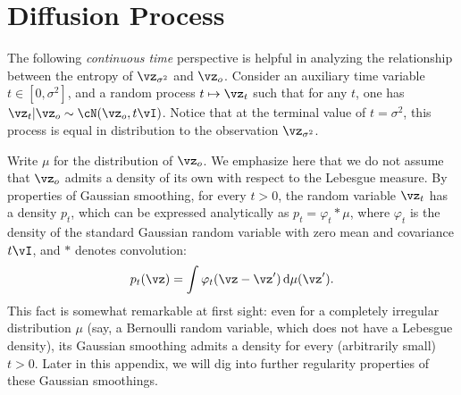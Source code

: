 \documentclass[../../book-main.tex]{subfiles}
\begin{document}
\section{Diffusion Process}

The following \textit{continuous time} perspective is helpful in analyzing the
relationship between the entropy of $\vz_{\sigma^2}$ and $\vz_o$. Consider an
auxiliary time variable $t \in [0, \sigma^2]$, and a random process $t\mapsto
\vz_t$ such that for any $t$, one has $\vz_t | \vz_o \sim \cN(\vz_o, t\vI)$.
Notice that at the terminal value of $t = \sigma^2$, this process is equal in
distribution to the observation $\vz_{\sigma^2}$.

Write $\mu$ for the distribution of $\vz_o$.
We emphasize here that we do not assume that $\vz_o$ admits a density of its own
with respect to the Lebesgue measure.
By properties of Gaussian smoothing, for every $t > 0$,
the random variable $\vz_t$ has a density $p_t$, which can be expressed
analytically as $p_t = \varphi_{t} \mathop{\ast} \mu$, where $\varphi_t$ is the
density of the standard Gaussian random variable with zero mean and covariance
$t \vI$, and $\ast$ denotes convolution:
\begin{equation}\label{eq:gaussian-smoothing}
  p_t(\vz) = \int \varphi_t(\vz - \vz') \odif \mu(\vz').
\end{equation}
This fact is somewhat remarkable at first sight: even for a completely irregular
distribution $\mu$ (say, a Bernoulli random variable, which does not have
a Lebesgue density), its Gaussian smoothing admits a density for every
(arbitrarily small) $t>0$.
Later in this appendix, we will dig into further regularity properties of these
Gaussian smoothings.
\end{document}
